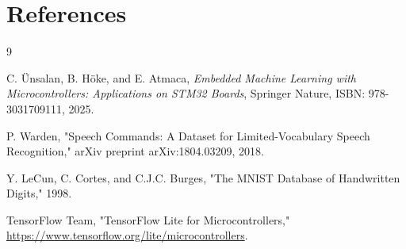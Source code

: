 \documentclass[12pt,a4paper]{article}
\begin{document}
\section*{References}

\begin{thebibliography}{9}

C. Ünsalan, B. Höke, and E. Atmaca, \textit{Embedded Machine Learning with Microcontrollers: Applications on STM32 Boards}, Springer Nature, ISBN: 978-3031709111, 2025.

P. Warden, "Speech Commands: A Dataset for Limited-Vocabulary Speech Recognition," arXiv preprint arXiv:1804.03209, 2018.

Y. LeCun, C. Cortes, and C.J.C. Burges, "The MNIST Database of Handwritten Digits," 1998.

TensorFlow Team, "TensorFlow Lite for Microcontrollers," \url{https://www.tensorflow.org/lite/microcontrollers}.

\end{thebibliography}
\end{document}
